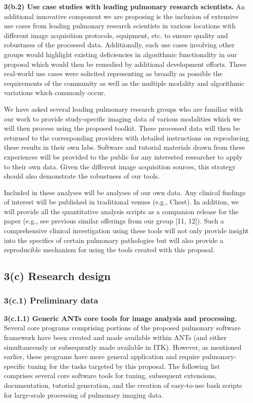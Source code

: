 \documentclass[11pt,]{article}
\begin{document}
\textbf{3(b.2) Use case studies with leading pulmonary research
scientists.} An additional innovative component we are proposing is the
inclusion of extensive use cases from leading pulmonary research
scientists in various locations with different image acquisition
protocols, equipment, etc. to ensure quality and robustness of the
processed data. Additionally, such use cases involving other groups
would highlight existing deficiencies in algorithmic functionality in
our proposal which would then be remedied by additional development
efforts. These real-world use cases were solicited representing as
broadly as possible the requirements of the community as well as the
multiple modality and algorithmic variations which commonly occur.

We have asked several leading pulmonary research groups who are familiar
with our work to provide study-specific imaging data of various
modalities which we will then process using the proposed toolkit. These
processed data will then be returned to the corresponding providers with
detailed instructions on reproducing these results in their own labs.
Software and tutorial materials drawn from these experiences will be
provided to the public for any interested researcher to apply to their
own data. Given the different image acquisition sources, this strategy
should also demonstrate the robustness of our tools.

Included in these analyses will be analyses of our own data. Any
clinical findings of interest will be published in traditional venues
(e.g., Chest). In addition, we will provide all the quantitative
analysis scripts as a companion release for the paper (e.g., see
previous similar offerings from our group {[}11, 12{]}). Such a
comprehensive clinical investigation using these tools will not only
provide insight into the specifics of certain pulmonary pathologies but
will also provide a reproducible mechanism for using the tools created
with this proposal.

\subsection{\textbf{3(c) Research design}}\label{c-research-design}

\subsubsection{3(c.1) Preliminary data}\label{c.1-preliminary-data}

\textbf{3(c.1.1) Generic ANTs core tools for image analysis and
processing.} Several core programs comprising portions of the proposed
pulmonary software framework have been created and made available within
ANTs (and either simultaneously or subsequently made available in ITK).
However, as mentioned earlier, these programs have more general
application and require pulmonary-specific tuning for the tasks targeted
by this proposal. The following list comprises several core software
tools for tuning, subsequent extensions, documentation, tutorial
generation, and the creation of easy-to-use bash scripts for large-scale
processing of pulmonary imaging data.
\end{document}
